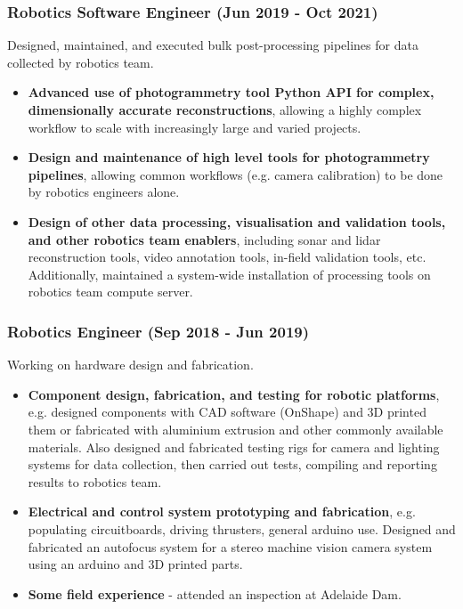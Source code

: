 \documentclass[12pt]{article}
\begin{document}
\begin{FlushLeft}
  \subsubsection{Robotics Software Engineer (Jun 2019 - Oct 2021)}
  Designed, maintained, and executed bulk post-processing pipelines for data collected by robotics team.
  \begin{itemize}
  \item \textbf{Advanced use of photogrammetry tool Python API for complex, dimensionally accurate reconstructions}, allowing a highly complex workflow to scale with increasingly large and varied projects.
  \item \textbf{Design and maintenance of high level tools for photogrammetry pipelines}, allowing common workflows (e.g. camera calibration) to be done by robotics engineers alone.
  \item \textbf{Design of other data processing, visualisation and validation tools, and other robotics team enablers}, including sonar and lidar reconstruction tools, video annotation tools, in-field validation tools, etc. Additionally, maintained a system-wide installation of processing tools on robotics team compute server.
  \end{itemize}

  \subsubsection{Robotics Engineer (Sep 2018 - Jun 2019)}
  Working on hardware design and fabrication.
  \begin{itemize}
  \item \textbf{Component design, fabrication, and testing for robotic platforms}, e.g. designed components with CAD software (OnShape) and 3D printed them or fabricated with aluminium extrusion and other commonly available materials. Also designed and fabricated testing rigs for camera and lighting systems for data collection, then carried out tests, compiling and reporting results to robotics team.
  \item \textbf{Electrical and control system prototyping and fabrication}, e.g. populating circuitboards, driving thrusters, general arduino use. Designed and fabricated an autofocus system for a stereo machine vision camera system using an arduino and 3D printed parts.
  \item \textbf{Some field experience} - attended an inspection at Adelaide Dam.
  \end{itemize}


\end{FlushLeft}
\end{document}
